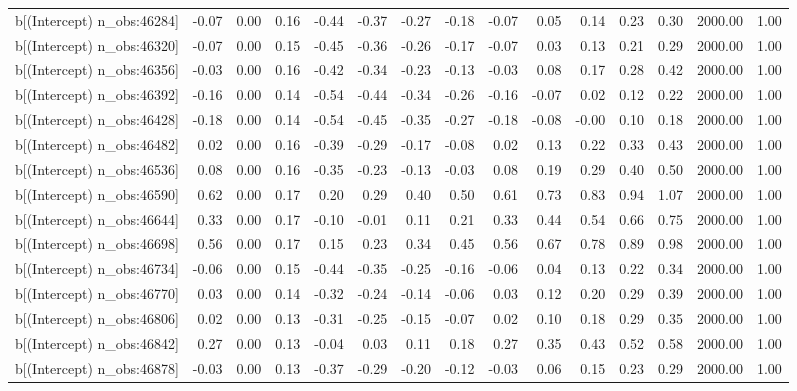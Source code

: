 \begin{table}[ht]
\begin{tabular}{rrrrrrrrrrrrrrr}
  b[(Intercept) n\_obs:46284] & -0.07 & 0.00 & 0.16 & -0.44 & -0.37 & -0.27 & -0.18 & -0.07 & 0.05 & 0.14 & 0.23 & 0.30 & 2000.00 & 1.00 \\ 
  b[(Intercept) n\_obs:46320] & -0.07 & 0.00 & 0.15 & -0.45 & -0.36 & -0.26 & -0.17 & -0.07 & 0.03 & 0.13 & 0.21 & 0.29 & 2000.00 & 1.00 \\ 
  b[(Intercept) n\_obs:46356] & -0.03 & 0.00 & 0.16 & -0.42 & -0.34 & -0.23 & -0.13 & -0.03 & 0.08 & 0.17 & 0.28 & 0.42 & 2000.00 & 1.00 \\ 
  b[(Intercept) n\_obs:46392] & -0.16 & 0.00 & 0.14 & -0.54 & -0.44 & -0.34 & -0.26 & -0.16 & -0.07 & 0.02 & 0.12 & 0.22 & 2000.00 & 1.00 \\ 
  b[(Intercept) n\_obs:46428] & -0.18 & 0.00 & 0.14 & -0.54 & -0.45 & -0.35 & -0.27 & -0.18 & -0.08 & -0.00 & 0.10 & 0.18 & 2000.00 & 1.00 \\ 
  b[(Intercept) n\_obs:46482] & 0.02 & 0.00 & 0.16 & -0.39 & -0.29 & -0.17 & -0.08 & 0.02 & 0.13 & 0.22 & 0.33 & 0.43 & 2000.00 & 1.00 \\ 
  b[(Intercept) n\_obs:46536] & 0.08 & 0.00 & 0.16 & -0.35 & -0.23 & -0.13 & -0.03 & 0.08 & 0.19 & 0.29 & 0.40 & 0.50 & 2000.00 & 1.00 \\ 
  b[(Intercept) n\_obs:46590] & 0.62 & 0.00 & 0.17 & 0.20 & 0.29 & 0.40 & 0.50 & 0.61 & 0.73 & 0.83 & 0.94 & 1.07 & 2000.00 & 1.00 \\ 
  b[(Intercept) n\_obs:46644] & 0.33 & 0.00 & 0.17 & -0.10 & -0.01 & 0.11 & 0.21 & 0.33 & 0.44 & 0.54 & 0.66 & 0.75 & 2000.00 & 1.00 \\ 
  b[(Intercept) n\_obs:46698] & 0.56 & 0.00 & 0.17 & 0.15 & 0.23 & 0.34 & 0.45 & 0.56 & 0.67 & 0.78 & 0.89 & 0.98 & 2000.00 & 1.00 \\ 
  b[(Intercept) n\_obs:46734] & -0.06 & 0.00 & 0.15 & -0.44 & -0.35 & -0.25 & -0.16 & -0.06 & 0.04 & 0.13 & 0.22 & 0.34 & 2000.00 & 1.00 \\ 
  b[(Intercept) n\_obs:46770] & 0.03 & 0.00 & 0.14 & -0.32 & -0.24 & -0.14 & -0.06 & 0.03 & 0.12 & 0.20 & 0.29 & 0.39 & 2000.00 & 1.00 \\ 
  b[(Intercept) n\_obs:46806] & 0.02 & 0.00 & 0.13 & -0.31 & -0.25 & -0.15 & -0.07 & 0.02 & 0.10 & 0.18 & 0.29 & 0.35 & 2000.00 & 1.00 \\ 
  b[(Intercept) n\_obs:46842] & 0.27 & 0.00 & 0.13 & -0.04 & 0.03 & 0.11 & 0.18 & 0.27 & 0.35 & 0.43 & 0.52 & 0.58 & 2000.00 & 1.00 \\ 
  b[(Intercept) n\_obs:46878] & -0.03 & 0.00 & 0.13 & -0.37 & -0.29 & -0.20 & -0.12 & -0.03 & 0.06 & 0.15 & 0.23 & 0.29 & 2000.00 & 1.00 \\ 

\end{tabular}
\end{table}
